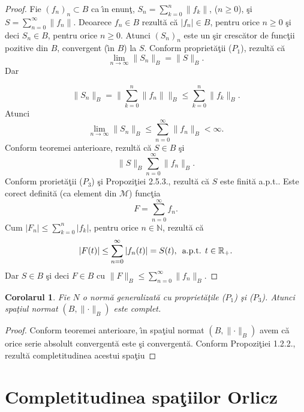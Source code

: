 \documentclass[ a4paper, 12pt]{report}
\newtheorem{cor}[theorem]{\bf Corolarul}
\theoremstyle{definition}
\theoremstyle{remark}
\numberwithin{equation}{section}
\begin{document}
\begin{proof} Fie $(f_n)_n \subset B$ ca \^\i n enun\c t, $S_n = \sum\limits_{k = 0}^n \lVert f_k \rVert$, ($n \geq 0$), \c si $S = \sum\limits_{n = 0}^\infty \lVert f_n \rVert$. Deoarece $f_n \in B$ rezult\u a c\u a $\lvert f_n \rvert \in B$, pentru orice $n \geq 0$ \c si deci $S_n \in B$, pentru orice $n \geq 0$. Atunci $(S_n)_n$ este un \c sir cresc\u ator de func\c tii pozitive din $B$, convergent (\^\i n $B$)  la $S$. Conform propriet\u a\c tii ($P_1$), rezult\u  a c\u a
$$\lim\limits_{ n \to \infty} \lVert S_n \rVert_B =  \lVert S \rVert_B.$$ Dar

$$\lVert S_n \rVert_B = \lVert \sum\limits_{k = 0}^n \lVert f_n \rVert \rVert_B \leq \sum\limits_{k = 0}^n \lVert f_k \rVert_B.$$ Atunci
$$\lim\limits_{n \to \infty}\lVert S_n \rVert_B  \leq \sum\limits_{n = 0}^\infty \lVert f_n \rVert_B < \infty.$$ Conform teoremei anterioare, rezult\u a c\u a $S \in B$ \c si
$$\lVert S \rVert_B \sum\limits_{n = 0}^\infty \lVert f_n \rVert_B.$$ Conform proriet\u a\c tii ($P_3$) \c si Propozi\c tiei 2.5.3., rezult\u a  c\u a $S$ este finit\u a a.p.t.. Este corect definit\u a  (ca element din $\mathcal{M}$) func\c tia
$$F = \sum\limits_{n = 0}^\infty f_n.$$
Cum $|F_n| \leq \sum\limits_{k = 0}^n |f_k|$, pentru orice $n \in \mathbb{N}$, rezult\u a c\u a
$$|F(t)| \leq \sum\limits_{n = 0}^\infty |f_n(t)| = S(t),\, \hbox{ a.p.t. } t \in \mathbb{R}_+.$$
Dar $S \in B$ \c si deci $F \in B$ cu $\lVert F\rVert_B \leq \sum\limits_{n = 0}^\infty \lVert f_n \rVert_B$.
\end{proof}

\begin{cor}
Fie $N$ o norm\u a generalizat\u a cu propriet\u a\c tile ($P_1$) \c si ($P_3$). Atunci spa\c tiul normat $(B, \lVert\cdot \rVert_B)$ este complet.
\end{cor}

\begin{proof}
Conform teoremei anterioare, \^\i n spa\c tiul normat $(B, \lVert\cdot \rVert_B)$ avem c\u a orice serie absolult convergent\u a este \c si convergent\u a. Conform Propozi\c tiei 1.2.2., rezult\u a completitudinea acestui spa\c tiu
\end{proof}


\newpage

\section{Completitudinea spa\c tiilor Orlicz}
\end{document}
